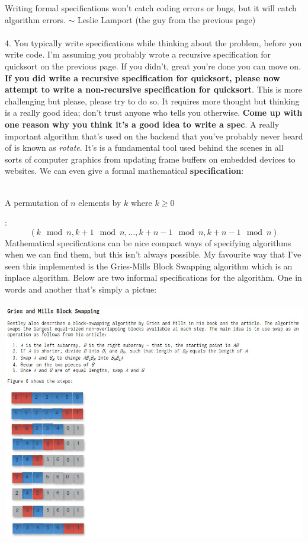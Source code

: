 \documentclass[12pt]{article}
\begin{document}
Writing formal specifications won't catch coding errors or bugs, but it will catch algorithm errors. $\sim$ Leslie Lamport (the guy from the previous page)
\\\\4. You typically write specifications while thinking about the problem, before you write code. I'm assuming you probably wrote a recursive specification for quicksort on the previous page. If you didn't, great you're done you can move on. \textbf{If you did write a recursive specification for quicksort, please now attempt to write a non-recursive specification for quicksort}. This is more challenging but please, please try to do so. It requires more thought but thinking is a really good idea; don't trust anyone who tells you otherwise. \textbf{Come up with one reason why you think it's a good idea to write a spec}.
\newpage
\noindent A really important algorithm that's used on the backend that you've probably never heard of is known as \textit{rotate}. It's is a fundamental tool used behind the scenes in all sorts of computer graphics from updating frame buffers on embedded devices to websites. We can even give a formal mathematical \textbf{specification}:  \\\\
\centerline{A permutation of $n$ elements by $k$ where $k\geq 0$}:
$$(k\mod{n},k+1\mod{n},\dots,k+n-1\mod{n},k+n-1\mod{n})$$
Mathematical specifications can be nice compact ways of specifying algorithms when we can find them, but this isn't always possible. My favourite way that I've seen this implemented is the Gries-Mills Block Swapping algorithm which is an inplace algorithm. Below are two informal specifications for the algorithm. One in words and another that's simply a pictue:\\\\
\noindent \includegraphics[scale = 0.62]{griesmills.jpg}
\end{document}

